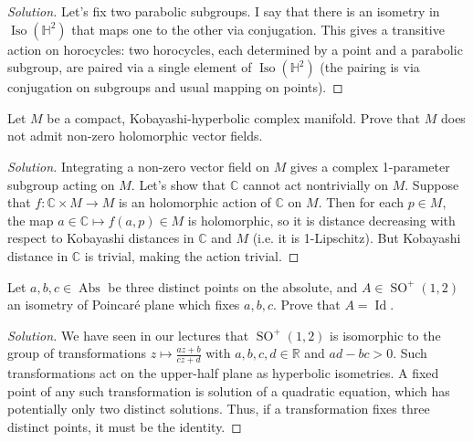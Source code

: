 \begin{proof}[Solution]
	Let's fix two parabolic subgroups. I say that there is an isometry in $\operatorname{Iso}(\mathbb{H}^2)$ that maps one to the other via conjugation. This gives a transitive action on horocycles: two horocycles, each determined by a point and a parabolic subgroup, are paired via a single element of $\operatorname{Iso}(\mathbb{H}^2)$ (the pairing is via conjugation on subgroups and usual mapping on points).
\end{proof}

\begin{manualexercise}{4.2}
	Let $M$ be a compact, Kobayashi-hyperbolic complex manifold. Prove that $M$ does not admit non-zero holomorphic vector fields.
\end{manualexercise}

\begin{proof}[Solution]\leavevmode

Integrating a non-zero vector field on $M$ gives a complex 1-parameter subgroup acting on $M$. Let's show that $\mathbb{C}$ cannot act nontrivially on $M$. Suppose that $f:\mathbb{C}\times M\to M $ is an holomorphic action of $\mathbb{C}$ on $M$. Then for each $p\in M$, the map $a\in\mathbb{C}\mapsto f(a,p)\in M$ is holomorphic, so it is distance decreasing with respect to Kobayashi distances in $\mathbb{C}$ and $M$ (i.e. it is 1-Lipschitz). But Kobayashi distance in $\mathbb{C}$ is trivial, making the action trivial.
\end{proof}

\begin{manualexercise}{4.6}
	Let $a,b,c\in \operatorname{Abs}$ be three distinct points on the absolute, and $A\in \operatorname{SO}^{+}(1,2)$ an isometry of Poincar\'e plane which fixes $a,b,c$. Prove that $A=\operatorname{Id}$.
\end{manualexercise}

\begin{proof}[Solution]
	We have seen in our lectures that $\operatorname{SO}^{+}(1,2)$ is isomorphic to the group of transformations $z\mapsto \frac{az+b}{cz+d}$ with $a,b,c,d\in \mathbb{R}$ and $ad-bc>0$. Such transformations act on the upper-half plane as hyperbolic isometries.  A fixed point of any such transformation is solution of a quadratic equation, which has potentially only two distinct solutions. Thus, if a transformation fixes three distinct points, it must be the identity.
\end{proof}

